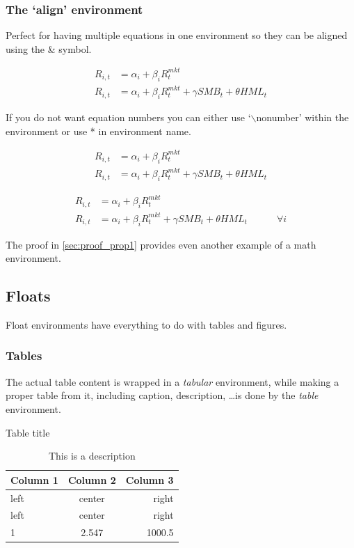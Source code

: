 \documentclass[11pt,a4paper,english,oneside]{book}
\begin{document}
\subsubsection{The `align' environment}
Perfect for having multiple equations in one environment so they can be aligned using the \& symbol.

\begin{align}
    R_{i, t} &= \alpha_i + \beta_i R^{mkt}_t \label{eq:CAPM}\\
    R_{i, t} &= \alpha_i + \beta_i R^{mkt}_t + \gamma SMB_t + \theta HML_t \label{eq:FF3}
\end{align}

If you do not want equation numbers you can either use `\(\backslash\)nonumber' within the environment or use * in environment name.

\begin{align}
    \nonumber R_{i, t} &= \alpha_i + \beta_i R^{mkt}_t \\
    R_{i, t} &= \alpha_i + \beta_i R^{mkt}_t + \gamma SMB_t + \theta HML_t
\end{align}

\begin{align*}
    R_{i, t} &= \alpha_i + \beta_i R^{mkt}_t \\
    R_{i, t} &= \alpha_i + \beta_i R^{mkt}_t + \gamma SMB_t + \theta HML_t \quad\quad\quad \forall i
\end{align*}

The proof in \cref{sec:proof_prop1} provides even another example of a math environment.


\subsection{Floats}
Float environments have everything to do with tables and figures.

\subsubsection{Tables}
The actual table content is wrapped in a \emph{tabular} environment, while making a proper table from it, including caption, description, \ldots is done by the \emph{table} environment.

\begin{table}[H] %
    \caption{Table title\label{tbl:try_table}}
    \caption*{This is a description}
    \center%
    \begin{tabular}{lcr}
        \toprule
        \textbf{Column 1}  & \textbf{Column 2} & \textbf{Column 3} \\
        \midrule
        left  & center & right \\
        left  & center & right \\
        \midrule
        1 & 2.547 & 1000.5  \\
        \bottomrule
    \end{tabular}
\end{table}
\end{document}
